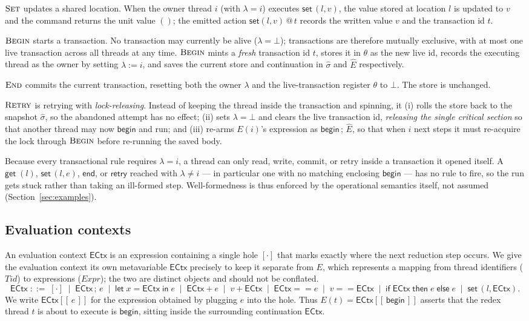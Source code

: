 \documentclass[manuscript,nonacm]{acmart}
\makeatletter
\theoremstyle{acmdefinition}
\newcommand{\unit}{()}
\newcommand{\bbegin}{\textsf{begin}}
\newcommand{\eend}{\textsf{end}}
\newcommand{\retry}{\textsf{retry}}
\newcommand{\getc}[1]{\textsf{get}\;(#1)}
\newcommand{\setc}[2]{\textsf{set}\,(#1,#2)}
\newcommand{\ectx}{\mathsf{ECtx}}
\newcommand{\ehole}[1]{\ectx[[\, #1 \,]]}
\newcommand{\setev}[3]{\textsf{set}(#1,#2)\,@\,#3}
\makeatother
\begin{document}
$\textrm{\sc{Set}}$ updates a shared location. When the owner thread $i$ (with $\lambda = i$) executes
$\setc{l}{v}$, the value stored at location $l$ is updated to $v$ and the
command returns the unit value $\unit$; the emitted action $\setev{l}{v}{t}$ records the written value $v$ and the transaction id $t$.

$\textrm{\sc{Begin}}$ starts a transaction. No transaction may currently be alive ($\lambda = \bot$); transactions are therefore mutually exclusive, with at most one live transaction across all threads at any time. $\textrm{\sc{Begin}}$ mints a \emph{fresh} transaction id $t$, stores it in $\theta$ as the new live id, records the executing thread as the owner by setting $\lambda := i$, and saves the current store and continuation in $\hat{\sigma}$ and $\hat{E}$ respectively.

$\textsc{End}$ commits the current transaction, resetting both the owner $\lambda$ and the live-transaction register $\theta$ to $\bot$. The store is unchanged.


$\textsc{Retry}$ is retrying with \emph{lock-releasing}. Instead of keeping the thread inside the transaction and spinning, it (i) rolls the store back to the snapshot $\hat{\sigma}$, so the abandoned attempt has no effect; (ii) sets $\lambda=\bot$ and clears the live transaction id, \emph{releasing the single critical section} so that another thread may now $\bbegin$ and run; and (iii) re-arms $E(i)$'s expression as $\bbegin\,;\,\hat{E}$, so that when $i$ next steps it must re-acquire the lock through $\textsc{Begin}$ before re-running the saved body.

Because every transactional rule requires $\lambda = i$, a thread can only read, write, commit, or retry inside a transaction it opened itself. A $\getc{l}$, $\setc{l}{e}$, $\eend$, or $\retry$ reached with $\lambda \neq i$ --- in particular one with no matching enclosing $\bbegin$ --- has no rule to fire, so the run gets stuck rather than taking an ill-formed step. Well-formedness is thus enforced by the operational semantics itself, not assumed (Section~\ref{sec:examples}).

\subsection{Evaluation contexts}

An evaluation context $\ectx$ is an expression containing a single
hole $[\cdot]$ that marks exactly where the next reduction step occurs. We give
the evaluation context its own metavariable $\ectx$ precisely to keep it
separate from $E$, which represents a mapping from thread identifiers
($\mathit{Tid}$) to expressions ($\mathit{Expr}$); the two are distinct objects
and should not be conflated.
\[
\ectx \;::=\; [\cdot]
\;\mid\; \ectx\,;\,e
\;\mid\; \textsf{let}\;x = \ectx\;\textsf{in}\;e
\;\mid\; \ectx + e \;\mid\; v + \ectx
\;\mid\; \ectx == e \;\mid\; v == \ectx
\;\mid\; \textsf{if}\;\ectx\;\textsf{then}\;e\;\textsf{else}\;e
\;\mid\; \setc{l}{\ectx}.
\]
We write $\ehole{e}$ for the expression obtained by plugging $e$ into the hole. Thus
$E(t)=\ehole{\bbegin}$ asserts that the redex thread $t$ is about to execute is
$\bbegin$, sitting inside the surrounding continuation $\ectx$.
\end{document}
